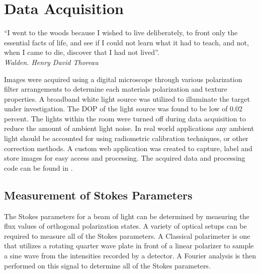 \chapter{Data Acquisition}
\begin{center}
  \begin{minipage}{0.75\textwidth}
    \begin{small}
      “I went to the woods because I wished to live deliberately, to front only the essential facts of life, and see if I could not learn what it had to teach, and not, when I came to die, discover that I had not lived”.\\
      \null\hfill\emph{Walden. Henry David Thoreau}
    \end{small}
  \end{minipage}
  \vspace{0.5cm}
\end{center}

Images were acquired using a digital microscope through various polarization filter arrangements to determine each materials polarization and texture properties.  A broadband white light source was utilized to illuminate the target under investigation.  The DOP of the light source was found to be low of 0.02 percent. The lights within the room were turned off during data acquisition to reduce the amount of ambient light noise.  In real world applications any ambient light should be accounted for using radiometric calibration techniques, or other correction methods.  A custom web application was created to capture, label and store images for easy access and processing.  The acquired data and processing code can be found in \cite{noob}.

\section{Measurement of Stokes Parameters}
The Stokes parameters for a beam of light can be determined by measuring the flux values of orthogonal polarization states.  A variety of optical setups can be required to measure all of the Stokes parameters.  A Classical polarimeter is one that utilizes a rotating quarter wave plate in front of a linear polarizer to sample a sine wave from the intensities recorded by a detector.  A Fourier analysis is then performed on this signal to determine all of the Stokes parameters.

